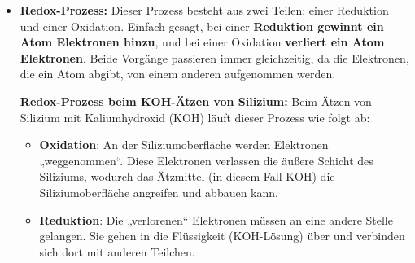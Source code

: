 \documentclass{article} %
\begin{document}
\begin{itemize}
    \item \textbf{Redox-Prozess:} Dieser Prozess besteht aus zwei Teilen: einer Reduktion und einer Oxidation. Einfach gesagt, bei einer \textbf{Reduktion gewinnt ein Atom Elektronen hinzu}, und bei einer Oxidation \textbf{verliert ein Atom Elektronen}. Beide Vorgänge passieren immer gleichzeitig, da die Elektronen, die ein Atom abgibt, von einem anderen aufgenommen werden.

    \textbf{Redox-Prozess beim KOH-Ätzen von Silizium:} Beim Ätzen von Silizium mit Kaliumhydroxid (KOH) läuft dieser Prozess wie folgt ab:

    \begin{itemize}
        \item \textbf{Oxidation}: An der Siliziumoberfläche werden Elektronen „weggenommen“. Diese Elektronen verlassen die äußere Schicht des Siliziums, wodurch das Ätzmittel (in diesem Fall KOH) die Siliziumoberfläche angreifen und abbauen kann.
        
        \item \textbf{Reduktion}: Die „verlorenen“ Elektronen müssen an eine andere Stelle gelangen. Sie gehen in die Flüssigkeit (KOH-Lösung) über und verbinden sich dort mit anderen Teilchen.
    \end{itemize}
    

\end{itemize}
\end{document}
